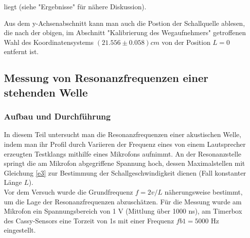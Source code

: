 \documentclass[]{article}
\begin{document}
liegt (siehe "Ergebnisse" für nähere Diskussion).

Aus dem y-Achsenabschnitt kann man auch die Postion der Schallquelle ablesen, die nach der obigen, im Abschnitt "Kalibrierung des Wegaufnehmers" getroffenen Wahl des Koordinatensystems $(21.556 \pm 0.058)cm$ von der Position $L=0$ entfernt ist.

	
	\subsection{Messung von Resonanzfrequenzen einer stehenden Welle}
	\subsubsection{Aufbau und Durchführung}
	In diesem Teil untersucht man die Resonanzfrequenzen einer akustischen Welle, indem man ihr Profil durch Variieren der Frequenz eines von einem Lautsprecher erzeugten Testklangs mithilfe eines Mikrofons aufnimmt. An der Resonanzstelle springt die am Mikrofon abgegriffene Spannung hoch, dessen Maximalstellen mit Gleichung \ref{e3} zur Bestimmung der Schallgeschwindigkeit dienen (Fall konstanter Länge $L$).\\
	Vor dem Versuch wurde die Grundfrequenz $f=2v/L$ näherungsweise bestimmt, um die Lage der Resonanzfrequenzen abzuschätzen. Für die Messung wurde  am Mikrofon ein Spannungsbereich von 1 V (Mittlung über 1000 ns), am Timerbox des Cassy-Sensors eine Torzeit von 1s mit einer Frequenz $fb1=5000$ Hz eingestellt.
	
\end{document}
